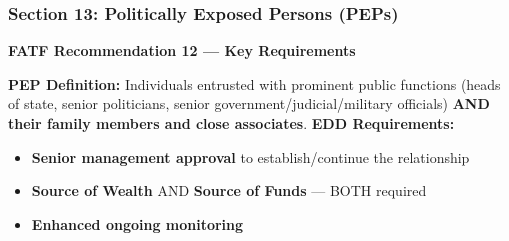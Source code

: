 \documentclass[12pt,aspectratio=169]{beamer}
\renewcommand{\scriptsize}{\fontsize{5}{6}\selectfont}
\begin{document}
	\begin{frame}
		\frametitle{\fontsize{13}{15}\selectfont \textbf{Section 13: Politically Exposed Persons (PEPs)}}
		\vspace{0.3cm}
		\begin{center}
			{\fontsize{12}{14}\selectfont \textbf{FATF Recommendation 12 — Key Requirements}}
		\end{center}
		\vspace{0.2cm}
		\begin{block}{}
			\scriptsize
			\textbf{PEP Definition:} Individuals entrusted with prominent public functions (heads of state, senior politicians, senior government/judicial/military officials) \textbf{AND their family members and close associates}.
			\vspace{0.1cm}
			\textbf{EDD Requirements:}
			\begin{itemize}
				\item \textbf{Senior management approval} to establish/continue the relationship
				\item \textbf{Source of Wealth} AND \textbf{Source of Funds} — BOTH required
				\item \textbf{Enhanced ongoing monitoring}
			\end{itemize}
		\end{block}
	\end{frame}
	
\end{document}

